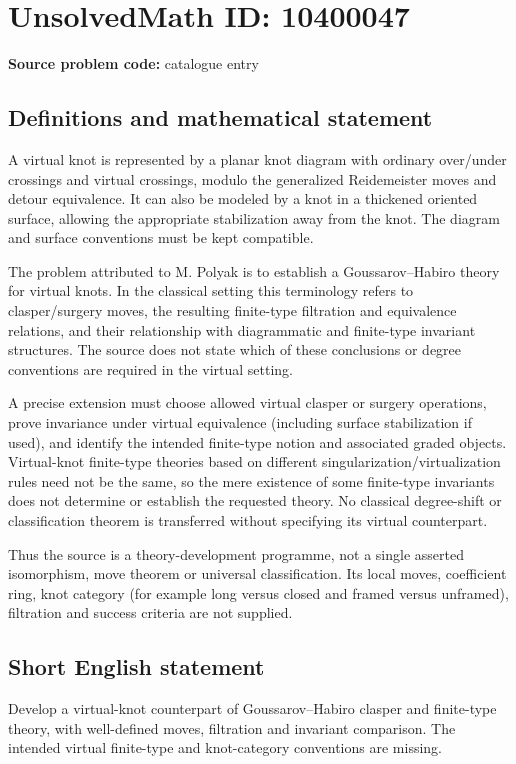 \documentclass[11pt]{article}
\begin{document}
\section*{UnsolvedMath ID: 10400047}
\textbf{Source problem code:} catalogue entry
\subsection{Definitions and mathematical statement}
A virtual knot is represented by a planar knot diagram with ordinary over/under crossings and virtual crossings, modulo the generalized Reidemeister moves and detour equivalence. It can also be modeled by a knot in a thickened oriented surface, allowing the appropriate stabilization away from the knot. The diagram and surface conventions must be kept compatible.

The problem attributed to M. Polyak is to establish a Goussarov--Habiro theory for virtual knots. In the classical setting this terminology refers to clasper/surgery moves, the resulting finite-type filtration and equivalence relations, and their relationship with diagrammatic and finite-type invariant structures. The source does not state which of these conclusions or degree conventions are required in the virtual setting.

A precise extension must choose allowed virtual clasper or surgery operations, prove invariance under virtual equivalence (including surface stabilization if used), and identify the intended finite-type notion and associated graded objects. Virtual-knot finite-type theories based on different singularization/virtualization rules need not be the same, so the mere existence of some finite-type invariants does not determine or establish the requested theory. No classical degree-shift or classification theorem is transferred without specifying its virtual counterpart.

Thus the source is a theory-development programme, not a single asserted isomorphism, move theorem or universal classification. Its local moves, coefficient ring, knot category (for example long versus closed and framed versus unframed), filtration and success criteria are not supplied.
\subsection{Short English statement}
Develop a virtual-knot counterpart of Goussarov--Habiro clasper and finite-type theory, with well-defined moves, filtration and invariant comparison. The intended virtual finite-type and knot-category conventions are missing.
\end{document}

